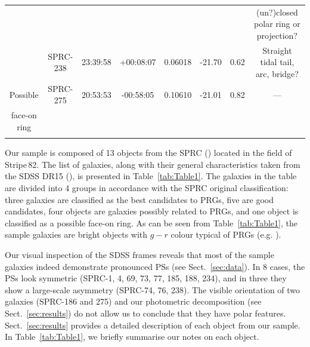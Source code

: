 \documentclass{raa}
\begin{document}
\begin{table}
\begin{tabular}{cccccccc}
           &                 &               &                  &               &            &          & (un?)closed polar ring or projection?   \tabularnewline
           &SPRC-238 & 23:39:58 & +00:08:07 & 0.06018 &-21.70 & 0.62 & Straight tidal tail, arc, bridge?   \tabularnewline
\hline
Possible   &SPRC-275 & 20:53:53 & -00:58:05 & 0.10610 &-21.01 & 0.82 & ---   \tabularnewline
face-on ring &       &        &       &        \tabularnewline
  \noalign{\smallskip}\hline
  \end{tabular}
\ec
 \end{table} 
 

Our sample is composed of 13 objects from the SPRC (\citealt{moiseev2011}) located in the 
field of Stripe\,82. The list of galaxies, along with their general
characteristics taken from the SDSS DR15 (\citealt{aguado2019}), 
is presented in Table~\ref{tab:Table1}. The galaxies in the table are divided into 4 
groups in accordance with the SPRC original classification:
three galaxies are classified as the best candidates to PRGs, 
five are good candidates, four objects are galaxies possibly related to PRGs, and
one object is classified as a possible face-on ring. As can be seen
from Table~\ref{tab:Table1}, the sample galaxies are bright objects with $g-r$ colour 
typical of PRGs (e.g. \citealt{rm2019}).

Our visual inspection of the SDSS frames reveals that most of the
sample galaxies indeed demonstrate pronounced PSs (see Sect.~\ref{sec:data}). 
In 8 cases, the PSs look symmetric (SPRC-1, 4, 69, 73, 77, 185,
188, 234), and in three they show a large-scale asymmetry (SPRC-74, 76, 238).
The visible orientation of two galaxies (SPRC-186 and 275) and our photometric decomposition (see Sect.~\ref{sec:results}) do not allow us to conclude that they have polar features. Sect.~\ref{sec:results} provides a detailed description of each object from our sample. In Table~\ref{tab:Table1}, we briefly summarise our notes on each object.
 
\end{document}
